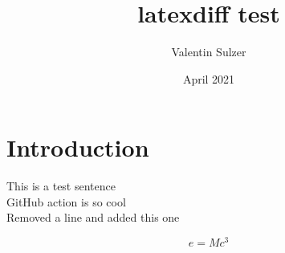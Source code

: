 \documentclass{article}
\title{latexdiff test}
\author{Valentin Sulzer}
\date{April 2021}
\begin{document}
\maketitle

\section{Introduction}

This is a test sentence
\\GitHub action is so cool
\\Removed a line and added this one

\begin{equation}
    e = Mc^3
\end{equation}
\end{document}
